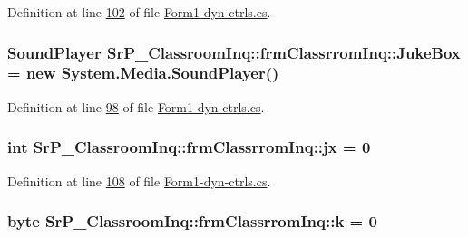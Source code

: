\-Definition at line \hyperlink{_form1-dyn-ctrls_8cs_source_l00102}{102} of file \hyperlink{_form1-dyn-ctrls_8cs_source}{\-Form1-\/dyn-\/ctrls.\-cs}.

\hypertarget{class_sr_p___classroom_inq_1_1frm_classrrom_inq_a10f0b7ba2800c1353aeee71344d08a94}{
\subsubsection[{\-Juke\-Box}]{\setlength{\rightskip}{0pt plus 5cm}\-Sound\-Player {\bf \-Sr\-P\-\_\-\-Classroom\-Inq\-::frm\-Classrrom\-Inq\-::\-Juke\-Box} = new \-System.\-Media.\-Sound\-Player()}}
\label{class_sr_p___classroom_inq_1_1frm_classrrom_inq_a10f0b7ba2800c1353aeee71344d08a94}


\-Definition at line \hyperlink{_form1-dyn-ctrls_8cs_source_l00098}{98} of file \hyperlink{_form1-dyn-ctrls_8cs_source}{\-Form1-\/dyn-\/ctrls.\-cs}.

\hypertarget{class_sr_p___classroom_inq_1_1frm_classrrom_inq_a6206484c9b4d5d7558f8904cad77cded}{
\subsubsection[{jx}]{\setlength{\rightskip}{0pt plus 5cm}int {\bf \-Sr\-P\-\_\-\-Classroom\-Inq\-::frm\-Classrrom\-Inq\-::jx} = 0}}
\label{class_sr_p___classroom_inq_1_1frm_classrrom_inq_a6206484c9b4d5d7558f8904cad77cded}


\-Definition at line \hyperlink{_form1-dyn-ctrls_8cs_source_l00108}{108} of file \hyperlink{_form1-dyn-ctrls_8cs_source}{\-Form1-\/dyn-\/ctrls.\-cs}.

\hypertarget{class_sr_p___classroom_inq_1_1frm_classrrom_inq_ad13cb123edd99d95b379613aad0f2a39}{
\subsubsection[{k}]{\setlength{\rightskip}{0pt plus 5cm}byte {\bf \-Sr\-P\-\_\-\-Classroom\-Inq\-::frm\-Classrrom\-Inq\-::k} = 0}}
\label{class_sr_p___classroom_inq_1_1frm_classrrom_inq_ad13cb123edd99d95b379613aad0f2a39}


